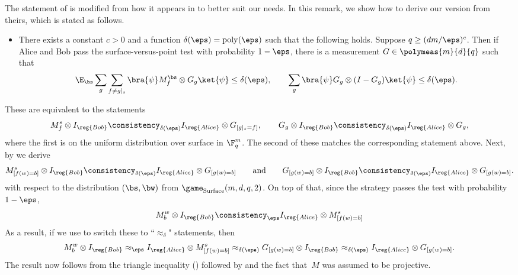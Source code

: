 \begin{remark}
The statement of  is modified from how it appears in \cite[Theorem 2]{NV18b} to better suit our needs.
In this remark, we show how to derive our version from theirs,
which is stated as follows.
\begin{itemize}
\item[$\circ$] There exists a constant $c >0$ and a function $\delta(\eps) = \mathrm{poly}(\eps)$ such that the following holds.
		Suppose $q \geq (dm/\eps)^c$. Then if Alice and Bob pass the surface-versus-point test with probability $1-\eps$, there is a measurement $G \in \polymeas{m}{d}{q}$
		such that
		\begin{equation}\label{eq:what-anand-and-thomas-proved}
		\E_{\bs} \sum_g \sum_{f \neq g|_s} \bra{\psi} M^{\bs}_f \otimes G_g \ket{\psi} \leq \delta(\eps),\qquad
		\sum_g \bra{\psi} G_g \otimes (I - G_g) \ket{\psi} \leq \delta(\eps).
		\end{equation}
\end{itemize}
These are equivalent to the statements
\begin{equation*}
M^s_f \otimes I_{\reg{Bob}} \consistency_{\delta(\eps)} I_{\reg{Alice}} \otimes G_{[g|_s=f]},
\qquad
G_g \otimes I_{\reg{Bob}} \consistency_{\delta(\eps)} I_{\reg{Alice}} \otimes G_g,
\end{equation*}
where the first is on the uniform distribution over surface in $\F_q^m$.
The second of these matches the corresponding statement above.
Next, by  we derive
\begin{equation*}
M^s_{[f(w) = b]} \otimes I_{\reg{Bob}} \consistency_{\delta(\eps)} I_{\reg{Alice}} \otimes G_{[g(w)=b]}
\qquad
\text{and}
\qquad
G_{[g(w) = b]} \otimes I_{\reg{Bob}} \consistency_{\delta(\eps)} I_{\reg{Alice}} \otimes G_{[g(w) = b]}.
\end{equation*}
with respect to the distribution $(\bs, \bw)$ from $\game_{\mathrm{Surface}}(m,d,q,2)$.
On top of that, since the strategy passes the test with probability $1-\eps$,
\begin{equation*}
M^w_b \otimes I_{\reg{Bob}} \consistency_{\eps} I_{\reg{Alice}} \otimes M^s_{[f(w) = b]}
\end{equation*}
As a result, if we use  to switch these to ``$\approx_\delta$" statements, then
\begin{equation*}
M^w_b \otimes I_{\reg{Bob}}
\approx_{\eps} I_{\reg{Alice}} \otimes M^s_{[f(w) = b]}
\approx_{\delta(\eps)} G_{[g(w)=b]} \otimes  I_{\reg{Bob}} 
\approx_{\delta(\eps)} I_{\reg{Alice}} \otimes G_{[g(w) = b]}.
\end{equation*}
The result now follows from the triangle inequality () followed by  and the fact that~$M$ was assumed to be projective.


\end{remark}
